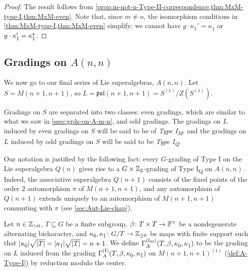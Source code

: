 \begin{proof}
    The result follows from \cref{prop:m-not-n-Type-II-correspondence,thm:MxM-type-I,thm:MxM-even}. 
    Note that, since $m \neq n$, the isomorphism conditions in \cref{thm:MxM-type-I,thm:MxM-even} simplify: we cannot have $g \cdot \kappa_{\bar 1}'=\kappa_{\bar 1}$ or $g \cdot \kappa_{\bar 1}'=\kappa_{\bar 1}^\star$. 
\end{proof}



\subsection{Gradings on \texorpdfstring{$A(n,n)$}{A(n,n)}}\label{ssec:grds-on-Ann}

We now go to our final series of Lie superalgebras, $A(n,n)$. 
Let $S = M(n+1, n+1)$,  
so $L = \mathfrak{psl} (n+1, n+1) = S^{(1)}/Z(S^{(1)})$. 

Gradings on $S$ are separated into two classes: even gradings, which are similar to what we saw in \cref{ssec:grds-on-A-m-n}, and odd gradings. 
The gradings on $L$ induced by even gradings on $S$ will be said to be of \emph{Type I\textsubscript{M}}, and the gradings on $L$ induced by odd gradings on $S$ will be said to be \emph{Type I\textsubscript{Q}}. 

\begin{remark}\label{prop:Q-implies-GxZZ2-grading-on-M}
    Our notation is justified by the following fact: 
    every $G$-grading of Type I on the Lie superalgebra $Q(n)$ gives rise to a $G\times \mathbb{Z}_2$-grading of Type I\textsubscript{Q} on $A(n,n)$. 
    Indeed, the associative superalgebra $Q(n+1)$ consists of the fixed points of the order $2$ automorphism $\pi$ of $M(n+1, n+1)$, and any automorphism of $Q(n+1)$ extends uniquely to an automorphism of $M(n+1, n+1)$ commuting with $\pi$ (see \cref{sec:Aut-Lie-chap}). 
\end{remark}

\begin{defi}\label{def:Type-I_M}
    Let $n\in \mathbb{Z}_{> 0}$, $T \subseteq G$ be a finite subgroup, $\beta\colon T\times T \to \mathbb{F}^\times$ be a nondegenerate alternating bicharacter, and $\kappa_{\bar{0}}, \kappa_{\bar{1}} \colon G/T \to \mathbb{Z}_{\geq 0}$ be maps with finite support such that $|\kappa_{\bar{0}}| \sqrt{|T|} = |\kappa_{\bar{1}}| \sqrt{|T|} = n+1$. 
    We define $\Gamma^{\mathrm{(I_M)}}_A(T, \beta, \kappa_{\bar{0}}, \kappa_{\bar{1}})$ to be the grading on $L$ induced from the grading $\Gamma^{\mathrm{(I)}}_A(T, \beta, \kappa_{\bar{0}}, \kappa_{\bar{1}})$ on $M(n+1, n+1)^{(1)}$ (\cref{def:A-Type-I}) by reduction modulo the center.
\end{defi}

